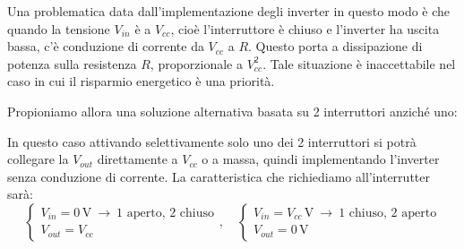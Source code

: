 \documentclass[a4paper,11pt]{article}
\begin{document}
\par\smallskip

Una problematica data dall'implementazione degli inverter in questo modo è che quando la tensione $V_{in}$ è a $V_{cc}$, cioè l'interruttore è chiuso e l'inverter ha uscita bassa, c'è conduzione di corrente da $V_{cc}$ a $R$. Questo porta a dissipazione di potenza sulla resistenza $R$, proporzionale a $V_{cc}^2$. Tale situazione è inaccettabile nel caso in cui il risparmio energetico è una priorità.

Propioniamo allora una soluzione alternativa basata su 2 interruttori anziché uno:
\begin{center}
\end{center}

In questo caso attivando selettivamente solo uno dei 2 interruttori si potrà collegare la $V_{out}$ direttamente a $V_{cc}$ o a massa, quindi implementando l'inverter senza conduzione di corrente. La caratteristica che richiediamo all'interrutter sarà:
$$
\begin{cases}
	V_{in} = 0 \, \mathrm V \ \rightarrow \ \text{1 aperto, 2 chiuso} \\
	V_{out} = V_{cc}
\end{cases}, \quad
\begin{cases}
	V_{in} = V_{cc} \, \mathrm V \ \rightarrow \ \text{1 chiuso, 2 aperto} \\
	V_{out} = 0 \, \mathrm{V} 
\end{cases}
$$
\end{document}
